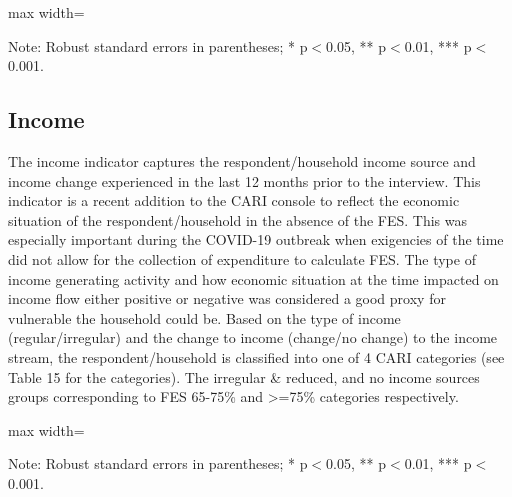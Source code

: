 \documentclass[11pt,harvard]{article}
\begin{document}
	\begin{table}[htbp]
		\centering
		\begin{adjustbox}{max width=\textwidth}
			\begin{threeparttable}
				\caption{Impact of Survey Modality on Expenditure and Food Expenditure Share}
				\scriptsize
				 
				\label{tab:FES_Modality_CAR}
				\begin{tablenotes}
					\item Note: Robust standard errors in parentheses; * p$<$0.05, ** p$<$0.01, *** p$<$0.001.
				\end{tablenotes}
			\end{threeparttable}
		\end{adjustbox}
	\end{table}
	
	
	\pagebreak
	
	
	\subsection{Income}
	
	The income indicator captures the respondent/household income source and income change experienced in the last 12 months prior to the interview. This indicator is a recent addition to the CARI console to reflect the economic situation of the respondent/household in the absence of the FES. This was especially important during the COVID-19 outbreak when exigencies of the time did not allow for the collection of expenditure to calculate FES. The type of income generating activity and how economic situation at the time impacted on income flow either positive or negative was considered a good proxy for vulnerable the household could be. Based on the type of income (regular/irregular) and the change to income (change/no change) to the income stream, the respondent/household is classified into one of 4 CARI categories (see Table 15 for the categories). The irregular \& reduced, and no income sources groups corresponding to FES 65-75\% and >=75\% categories respectively.
	
	
	\begin{table}[htbp]
		\centering
		\begin{adjustbox}{max width=\textwidth}
			\begin{threeparttable}
				\caption{Impact of Survey Modality on Income}
				\scriptsize
				 
				\label{tab:INC_Modality_CAR}
				\begin{tablenotes}
					\item Note: Robust standard errors in parentheses; * p$<$0.05, ** p$<$0.01, *** p$<$0.001. 
				\end{tablenotes}
			\end{threeparttable}
		\end{adjustbox}
	\end{table}
\end{document}

